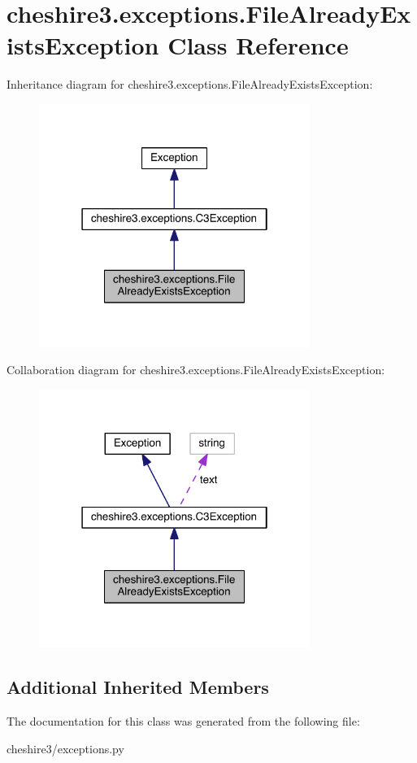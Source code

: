 \hypertarget{classcheshire3_1_1exceptions_1_1_file_already_exists_exception}{\section{cheshire3.\-exceptions.\-File\-Already\-Exists\-Exception Class Reference}
\label{classcheshire3_1_1exceptions_1_1_file_already_exists_exception}
}


Inheritance diagram for cheshire3.\-exceptions.\-File\-Already\-Exists\-Exception\-:
\nopagebreak
\begin{figure}[H]
\begin{center}
\leavevmode
\includegraphics[width=250pt]{classcheshire3_1_1exceptions_1_1_file_already_exists_exception__inherit__graph}
\end{center}
\end{figure}


Collaboration diagram for cheshire3.\-exceptions.\-File\-Already\-Exists\-Exception\-:
\nopagebreak
\begin{figure}[H]
\begin{center}
\leavevmode
\includegraphics[width=250pt]{classcheshire3_1_1exceptions_1_1_file_already_exists_exception__coll__graph}
\end{center}
\end{figure}
\subsection*{Additional Inherited Members}


The documentation for this class was generated from the following file\-:\begin{DoxyCompactItemize}
\item 
cheshire3/exceptions.\-py\end{DoxyCompactItemize}
